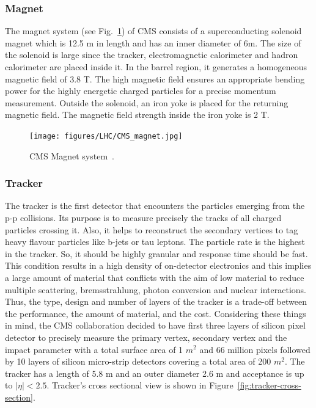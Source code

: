 \subsubsection{Magnet} %
\label{ssub:magnet}
The magnet system (see Fig.~\ref{fig:CMS-magnet}) of CMS consists of a superconducting solenoid magnet which is 12.5 m in length and has an inner diameter of 6m. The size of the solenoid is large since the tracker, electromagnetic calorimeter and hadron calorimeter are placed inside it. In the barrel region, it generates a homogeneous magnetic field of 3.8 T. The high magnetic field ensures an appropriate bending power for the highly energetic charged particles for a precise momentum measurement. Outside the solenoid, an iron yoke is placed for the returning magnetic field. The magnetic field strength inside the iron yoke is 2 T.
\begin{figure}[!htbp]
	\centering
	\texttt{[image: figures/LHC/CMS\_magnet.jpg]}
	\caption{CMS Magnet system~\cite{Brice2007}.}
	\label{fig:CMS-magnet}
\end{figure}

\subsubsection{Tracker} %
\label{ssub:tracker}
The tracker is the first detector that encounters the particles emerging from the p-p collisions. Its purpose is to measure precisely the tracks of all charged particles crossing it. Also, it helps to reconstruct the secondary vertices to tag heavy flavour particles like b-jets or tau leptons. The particle rate is the highest in the tracker. So, it should be highly granular and response time should be fast. This condition results in a high density of on-detector electronics and this implies a large amount of material that conflicts with the aim of low material to reduce multiple scattering, bremsstrahlung, photon conversion and nuclear interactions. Thus, the type, design and number of layers of the tracker is a trade-off between the performance, the amount of material, and the cost. Considering these things in mind, the CMS collaboration decided to have first three layers of silicon pixel detector to precisely measure the primary vertex, secondary vertex and the impact parameter with a total surface area of 1 $m^2$ and 66 million pixels followed by 10 layers of  silicon micro-strip detectors covering a total area of 200 $m^2$. The tracker has a length of 5.8 m and an outer diameter 2.6 m and acceptance is up to $|\eta|<2.5$. Tracker's cross sectional view is shown in Figure~\ref{fig:tracker-cross-section}.


